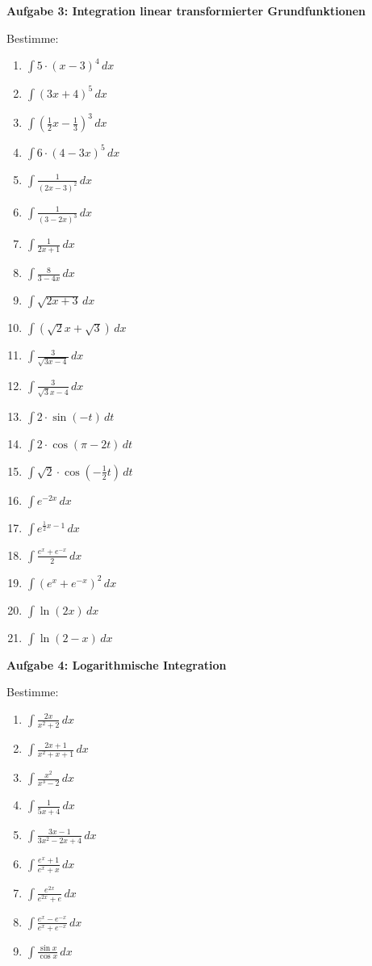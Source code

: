 \documentclass[a4paper,12pt]{article}
\newcommand{\Aufgabe}[1]{
  {
  \vspace*{0.5cm}
  \textsf{\textbf{Aufgabe #1}}
  \vspace*{0.2cm}
  
  }
}
\begin{document}
\Aufgabe{3: Integration linear transformierter Grundfunktionen}
Bestimme:
\begin{enumerate}[label={\alph*)}, topsep=5pt,itemsep=4ex,partopsep=1ex,parsep=1ex]
  \item $\int 5\cdot (x-3)^4\,dx$
  \item $\int (3x+4)^5\,dx$
  \item $\int (\frac{1}{2}x-\frac{1}{3})^3\,dx$
  \item $\int 6\cdot (4-3x)^5\,dx$
  \item $\int \frac{1}{(2x-3)^2}\,dx$
  \item $\int \frac{1}{(3-2x)^3}\,dx$
  \item $\int \frac{1}{2x+1}\,dx$
  \item $\int \frac{8}{3-4x}\,dx$
  \item $\int \sqrt{2x+3}\,dx$
  \item $\int (\sqrt{2}x+\sqrt{3})\,dx$
  \item $\int \frac{3}{\sqrt{3x-4}}\,dx$
  \item $\int \frac{3}{\sqrt{3}x-4}\,dx$
  \item $\int 2\cdot \sin(-t)\,dt$
  \item $\int 2\cdot \cos(\pi-2t)\,dt$
  \item $\int \sqrt{2}\cdot \cos(-\frac{1}{2}t)\,dt$
  \item $\int e^{-2x}\,dx$
  \item $\int e^{\frac{1}{2}x-1}\,dx$
  \item $\int \frac{e^x+e^{-x}}{2}\,dx$
  \item $\int (e^x+e^{-x})^2\,dx$
  \item $\int \ln(2x)\,dx$
  \item $\int \ln(2-x)\,dx$
\end{enumerate}



\Aufgabe{4: Logarithmische Integration}
Bestimme:
\begin{enumerate}[label={\alph*)}, topsep=5pt,itemsep=4ex,partopsep=1ex,parsep=1ex]
  \item $\int \frac{2x}{x^2+2}\,dx$
  \item $\int \frac{2x+1}{x^2+x+1}\,dx$
  \item $\int \frac{x^2}{x^3-2}\,dx$
  \item $\int \frac{1}{5x+4}\,dx$
  \item $\int \frac{3x-1}{3x^2-2x+4}\,dx$
  \item $\int \frac{e^x+1}{e^x+x}\,dx$
  \item $\int \frac{e^{2x}}{e^{2x}+e}\,dx$
  \item $\int \frac{e^x-e^{-x}}{e^x+e^{-x}}\,dx$
  \item $\int \frac{\sin{x}}{\cos{x}}\,dx$
\end{enumerate}
\end{document}
